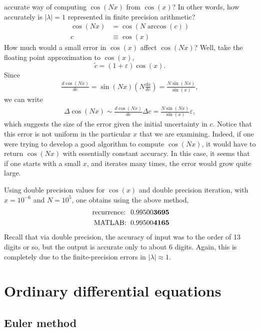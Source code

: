 \documentclass{mathnotes}
\begin{document}
accurate way of computing $\cos\left( Nx \right)$ from $\cos(x)$? In other words, how accurately is $|\lambda|=1$ represented in finite precision arithmetic?
\begin{align*}
    \cos(Nx)&=\cos(N\arccos(c))\\
    c&\equiv \cos(x)
\end{align*}
How much would a small error in $\cos(x)$ affect $\cos(Nx)$? Well, take the floating point approximation to $\cos(x)$,
\[\tilde{c}=(1+\varepsilon)\cos(x).\]
Since
\begin{align*}
    \frac{d\cos(Nx)}{dc}=\sin(Nx)\left( N\frac{dx}{dc} \right)=\frac{N\sin(Nx)}{\sin(x)},
\end{align*}
we can write
\begin{align*}
    \Delta\cos(Nx)\sim\frac{d\cos(Nx)}{dc}\Delta c=\frac{N\sin(Nx)}{\sin(x)}\varepsilon,
\end{align*}
which suggests the size of the error given the initial uncertainty in $c$. Notice that this error is not uniform in the particular $x$ that we are examining.
Indeed, if one were trying to develop a good algorithm to compute $\cos(Nx)$, it would have to return $\cos(Nx)$ with essentially constant accuracy. In this case,
it seems that if one starts with a small $x$, and iterates many times, the error would grow quite large.

\begin{exmp}
    Using double precision values for $\cos(x)$ and double precision iteration, with $x=10^{-6}$ and $N=10^5$, one obtains using the above method,
    \begin{align*}
        \;\textnormal{recurrence: }\; 0.99500\mathbf{3695}\\
        \;\textnormal{MATLAB: }\; 0.99500\mathbf{4165}
    \end{align*}
    Recall that via double precision, the accuracy of input was to the order of 13 digits or so, but the output is accurate only to about 6 digits. Again, this
    is completely due to the finite-precision errors in $|\lambda|\approx 1$.
\end{exmp}

\section{Ordinary differential equations}

\subsection{Euler method}
\end{document}
